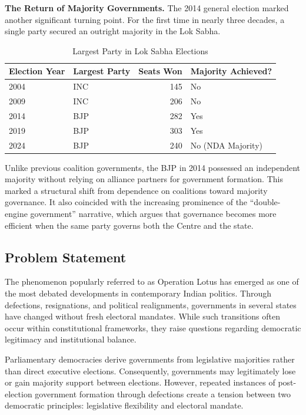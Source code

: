 \documentclass[11pt]{article}
\begin{document}
\textbf{The Return of Majority Governments.} The 2014 general election marked another significant turning point. For the first time in nearly three decades, a single party secured an outright majority in the Lok Sabha.

\begin{table}[h]
\centering
\caption{Largest Party in Lok Sabha Elections}
\begin{tabular}{llrl}
\toprule
Election Year & Largest Party & Seats Won & Majority Achieved?\\
\midrule
2004 & INC & 145 & No\\
2009 & INC & 206 & No\\
2014 & BJP & 282 & Yes\\
2019 & BJP & 303 & Yes\\
2024 & BJP & 240 & No (NDA Majority)\\
\bottomrule
\end{tabular}
\end{table}

Unlike previous coalition governments, the BJP in 2014 possessed an independent majority without relying on alliance partners for government formation. This marked a structural shift from dependence on coalitions toward majority governance. It also coincided with the increasing prominence of the ``double-engine government'' narrative, which argues that governance becomes more efficient when the same party governs both the Centre and the state.

\subsection{Problem Statement}
The phenomenon popularly referred to as Operation Lotus has emerged as one of the most debated developments in contemporary Indian politics. Through defections, resignations, and political realignments, governments in several states have changed without fresh electoral mandates. While such transitions often occur within constitutional frameworks, they raise questions regarding democratic legitimacy and institutional balance.

Parliamentary democracies derive governments from legislative majorities rather than direct executive elections. Consequently, governments may legitimately lose or gain majority support between elections. However, repeated instances of post-election government formation through defections create a tension between two democratic principles: legislative flexibility and electoral mandate.
\end{document}

